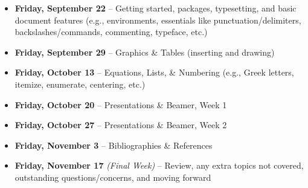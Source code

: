 \documentclass[11pt]{article}
\begin{document}
\begin{itemize}

	\item \textbf{Friday, September 22} -- Getting started, packages, typesetting, and basic document features (e.g., environments, essentials like punctuation/delimiters, backslashes/commands, commenting, typeface, etc.) \\
	
	\item \textbf{Friday, September 29} -- Graphics \& Tables (inserting and drawing) \\
	
	\item \textbf{Friday, October 13} -- Equations, Lists, \& Numbering (e.g., Greek letters, itemize, enumerate, centering, etc.) \\

	\item \textbf{Friday, October 20} -- Presentations \& Beamer, Week 1 \\

	\item \textbf{Friday, October 27} -- Presentations \& Beamer, Week 2 \\

	\item \textbf{Friday, November 3} -- Bibliographies \& References \\

	\item \textbf{Friday, November 17} \textit{(Final Week)} -- Review, any extra topics not covered, outstanding questions/concerns, and moving forward

\end{itemize}
\end{document}
